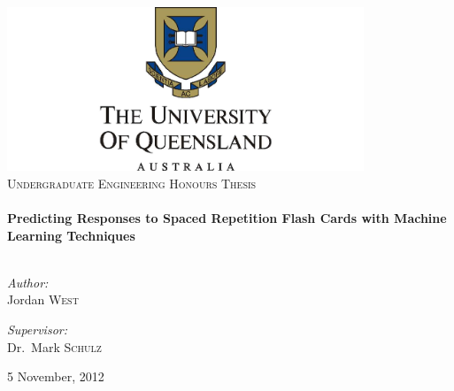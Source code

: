\begin{titlepage}

\begin{center}

\vspace*{3cm}

\includegraphics[width=0.8\textwidth]{./uqlogo.jpg}\\[1cm]    

\textsc{\Large Undergraduate Engineering Honours Thesis}\\[0.5cm]


\HRule \\[0.6cm]
{ \Large \bfseries Predicting Responses to Spaced Repetition Flash Cards with Machine Learning Techniques}\\[0.4cm]

\HRule \\[1.5cm]

\begin{minipage}{0.4\textwidth}
\begin{flushleft} \large
\emph{Author:}\\
Jordan \textsc{West}
\end{flushleft}
\end{minipage}
\begin{minipage}{0.4\textwidth}
\begin{flushright} \large
\emph{Supervisor:} \\
Dr.~Mark \textsc{Schulz}
\end{flushright}
\end{minipage}

\vfill

{\large 5 November, 2012}

\end{center}

\end{titlepage}
